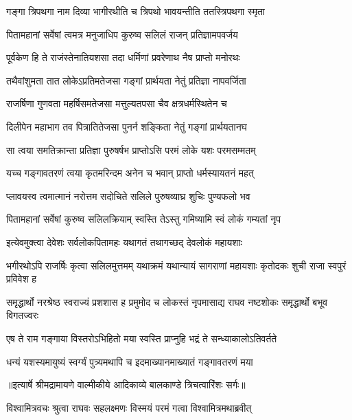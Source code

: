 \twolineshloka
{गङ्गा त्रिपथगा नाम दिव्या भागीरथीति च}
{त्रिपथो भावयन्तीति ततस्त्रिपथगा स्मृता} %

\twolineshloka
{पितामहानां सर्वेषां त्वमत्र मनुजाधिप}
{कुरुष्व सलिलं राजन् प्रतिज्ञामपवर्जय} %

\twolineshloka
{पूर्वकेण हि ते राजंस्तेनातियशसा तदा}
{धर्मिणां प्रवरेणाथ नैष प्राप्तो मनोरथः} %

\twolineshloka
{तथैवांशुमता तात लोकेऽप्रतिमतेजसा}
{गङ्गां प्रार्थयता नेतुं प्रतिज्ञा नापवर्जिता} %

\twolineshloka
{राजर्षिणा गुणवता महर्षिसमतेजसा}
{मत्तुल्यतपसा चैव क्षत्रधर्मस्थितेन च} %

\twolineshloka
{दिलीपेन महाभाग तव पित्रातितेजसा}
{पुनर्न शङ्किता नेतुं गङ्गां प्रार्थयतानघ} %

\twolineshloka
{सा त्वया समतिक्रान्ता प्रतिज्ञा पुरुषर्षभ}
{प्राप्तोऽसि परमं लोके यशः परमसम्मतम्} %

\twolineshloka
{यच्च गङ्गावतरणं त्वया कृतमरिन्दम}
{अनेन च भवान् प्राप्तो धर्मस्यायतनं महत्} %

\twolineshloka
{प्लावयस्व त्वमात्मानं नरोत्तम सदोचिते}
{सलिले पुरुषव्याघ्र शुचिः पुण्यफलो भव} %

\twolineshloka
{पितामहानां सर्वेषां कुरुष्व सलिलक्रियाम्}
{स्वस्ति तेऽस्तु गमिष्यामि स्वं लोकं गम्यतां नृप} %

\twolineshloka
{इत्येवमुक्त्वा देवेशः सर्वलोकपितामहः}
{यथागतं तथागच्छद् देवलोकं महायशाः} %

\threelineshloka
{भगीरथोऽपि राजर्षिः कृत्वा सलिलमुत्तमम्}
{यथाक्रमं यथान्यायं सागराणां महायशाः}
{कृतोदकः शुची राजा स्वपुरं प्रविवेश ह} %

\threelineshloka
{समृद्धार्थो नरश्रेष्ठ स्वराज्यं प्रशशास ह}
{प्रमुमोद च लोकस्तं नृपमासाद्य राघव}
{नष्टशोकः समृद्धार्थो बभूव विगतज्वरः} %

\twolineshloka
{एष ते राम गङ्गाया विस्तरोऽभिहितो मया}
{स्वस्ति प्राप्नुहि भद्रं ते सन्ध्याकालोऽतिवर्तते} %

\twolineshloka
{धन्यं यशस्यमायुष्यं स्वर्ग्यं पुत्र्यमथापि च}
{इदमाख्यानमाख्यातं गङ्गावतरणं मया} %


{॥इत्यार्षे श्रीमद्रामायणे वाल्मीकीये आदिकाव्ये बालकाण्डे त्रिचत्वारिंशः सर्गः॥}


\twolineshloka
{विश्वामित्रवचः श्रुत्वा राघवः सहलक्ष्मणः}
{विस्मयं परमं गत्वा विश्वामित्रमथाब्रवीत्} %

